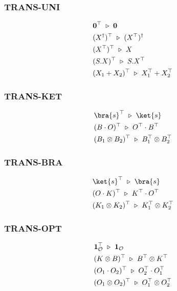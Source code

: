 \subsubsection*{\textsf{TRANS-UNI}}
\begin{align*}
  & \mathbf{0}^\top \ \triangleright\  \mathbf{0} \\
  & (X^\dagger)^\top \ \triangleright\  (X^\top)^\dagger \\
  & (X^\top)^\top \ \triangleright\  X \\
  & (S . X)^\top \ \triangleright\  S . X^\top \\
  & (X_1 + X_2)^\top \ \triangleright\  X_1^\top + X_2^\top \\
\end{align*}

\subsubsection*{\textsf{TRANS-KET}}
\begin{align*}
  & \bra{s}^\top \reduce \ket{s} \\
  & (B \cdot O)^\top \reduce O^\top \cdot B^\top \\
  & (B_1 \otimes B_2)^\top \reduce B_1^\top \otimes B_2^\top
\end{align*}

\subsubsection*{\textsf{TRANS-BRA}}
\begin{align*}
  & \ket{s}^\top \reduce \bra{s} \\
  & (O \cdot K)^\top \reduce K^\top \cdot O^\top \\
  & (K_1 \otimes K_2)^\top \reduce K_1^\top \otimes K_2^\top
\end{align*}

\subsubsection*{\textsf{TRANS-OPT}}
\begin{align*}
  & \mathbf{1}_\mathcal{O}^\top \ \triangleright\  \mathbf{1}_\mathcal{O} \\
  & (K \otimes B)^\top \ \triangleright\  B^\top \otimes K^\top \\
  & (O_1 \cdot O_2)^\top \ \triangleright\  O_2^\top \cdot O_1^\top \\
  & (O_1 \otimes O_2)^\top \ \triangleright\  O_1^\top \otimes O_2^\top
\end{align*}

